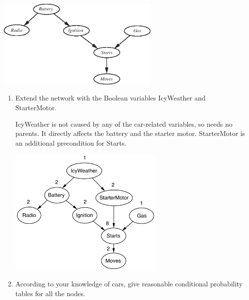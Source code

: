 \documentclass[11pt, a4paper]{article}
\begin{document}
\begin{center}
    \includegraphics[width=0.6\textwidth]{figures/e3_car.eps}
\end{center}

\begin{enumerate}
    \item Extend the network with the Boolean variables IcyWeather and StarterMotor.
    
    \begin{solution}
        IcyWeather is not caused by any of the car-related variables, so needs no parents. It directly affects the battery and the starter motor. StarterMotor is an additional precondition for Starts.
        
        \begin{center}
            \includegraphics[width=0.6\textwidth]{figures/e3_car_full.png}
        \end{center}
    \end{solution}
    
    \item According to your knowledge of cars, give reasonable conditional probability tables for all the nodes.
    

\end{enumerate}
\end{document}
